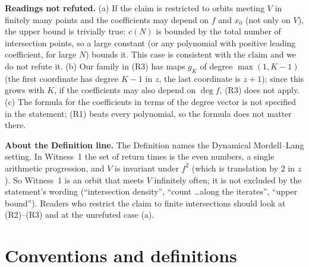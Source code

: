 \documentclass[11pt]{article}
\theoremstyle{definition}
\theoremstyle{remark}
\begin{document}
\textbf{Readings not refuted.} (a) If the claim is restricted to orbits meeting $V$ in finitely
many points and the coefficients may depend on $f$ and $x_0$ (not only on $V$), the upper bound is
trivially true: $c(N)$ is bounded by the total number of intersection points, so a large constant
(or any polynomial with positive leading coefficient, for large $N$) bounds it. This case is
consistent with the claim and we do not refute it. (b) Our family in (R3) has maps $g_K$ of degree
$\max(1,K-1)$ (the first coordinate has degree $K-1$ in $z$, the last coordinate is $z+1$); since
this grows with $K$, if the coefficients may also depend on $\deg f$, (R3) does not apply. (c) The formula
for the coefficients in terms of the degree vector is not specified in the statement; (R1) beats
every polynomial, so the formula does not matter there.

\textbf{About the Definition line.} The Definition names the Dynamical Mordell--Lang setting. In
Witness~1 the set of return times is the even numbers, a single arithmetic progression, and $V$ is
invariant under $f^2$ (which is translation by $2$ in $z$). So Witness~1 is an orbit that meets $V$
infinitely often; it is not excluded by the statement's wording (``intersection density'', ``count
\dots along the iterates'', ``upper bound''). Readers who restrict the claim to finite intersections
should look at (R2)--(R3) and at the unrefuted case (a).

\section{Conventions and definitions}
\end{document}
